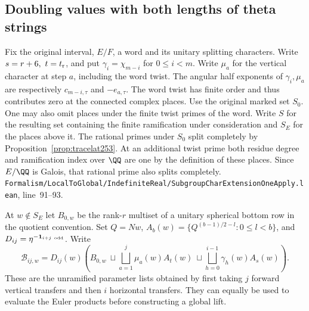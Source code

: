\documentclass[a4paper,11pt]{article}
\theoremstyle{definition}
\theoremstyle{remark}
\newcommand{\srcloc}[2]{{\small\nolinkurl{#1.lean}}, line~#2}
\numberwithin{equation}{section}
\begin{document}
\subsection{Doubling values with both lengths of theta strings}\label{nav:VI-38}
Fix the original interval, \(E/F\), a word and its unitary splitting
characters. Write \(s=r+6,\ t=t_{\rm r}\), and put
\(\gamma_i=\chi_{m-i}\) for \(0\le i<m\). Write \(\mu_a\) for
the vertical character at step \(a\), including the word twist.
The angular half exponents of \(\gamma_i,\mu_a\) are respectively
\(c_{m-i,\tau}\) and \(-e_{a,\tau}\). The word twist has finite
order and thus contributes zero at the connected complex places.
Use the original marked set \(S_0\). One may also omit places
under the finite twist primes of the word. Write \(S\) for the
resulting set containing the finite ramification under consideration
and \(S_E\) for the places above it. The rational primes under
\(S_0\) split completely by Proposition~\ref{prop:tracelat253}.
At an additional twist prime both residue degree and ramification
index over \(\QQ\) are one by the definition of these places.
Since \(E/\QQ\) is Galois, that rational prime also splits completely.
\srcloc{Formalism/LocalToGlobal/IndefiniteReal/SubgroupCharExtensionOneApply}{91--93}.

At \(w\notin S_E\) let \(B_{0,w}\) be the rank-\(r\) multiset of
a unitary spherical bottom row in the quotient convention. Set
\(Q=Nw\), \(A_b(w)=\{Q^{(b-1)/2-l}:0\le l<b\}\), and
\(D_{ij}=\eta^{-\mathbf1_{i+j\ {\rm odd}}}\). Write
\[
 \mathcal B_{ij,w}=D_{ij}(w)\left(
   B_{0,w}\ \sqcup\!
   \bigsqcup_{a=1}^j\mu_a(w)A_t(w)\ \sqcup\!
   \bigsqcup_{h=0}^{i-1}\gamma_h(w)A_s(w)\right).
\]
These are the unramified parameter lists obtained by first
taking \(j\) forward vertical transfers and then \(i\) horizontal
transfers. They can equally be used to evaluate the Euler
products before constructing a global lift.
\end{document}
